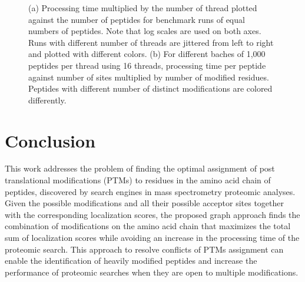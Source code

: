 \documentclass[]{article}
\begin{document}
\begin{figure}[!ht]
	\hfill
	\caption{(a) Processing time multiplied by the number of thread plotted against the number of peptides for benchmark runs of equal numbers of peptides. Note that log scales are used on both axes. Runs with different number of threads are jittered from left to right and plotted with different colors. (b) For different baches of 1,000 peptides per thread using 16 threads, processing time per peptide against number of sites multiplied by number of modified residues. Peptides with different number of distinct modifications are colored differently.}
	\label{fig:performance_test}
\end{figure}


\section{Conclusion}

	This work addresses the problem of finding the optimal assignment of post translational modifications (PTMs) to residues in the amino acid chain of peptides, discovered by search engines in mass spectrometry proteomic analyses. Given the possible modifications and all their possible acceptor sites together with the corresponding localization scores, the proposed graph approach finds the combination of modifications on the amino acid chain that maximizes the total sum of localization scores while avoiding an increase in the processing time of the proteomic search. This approach to resolve conflicts of PTMs assignment can enable the identification of heavily modified peptides and increase the performance of proteomic searches when they are open to multiple modifications. 
\end{document}
